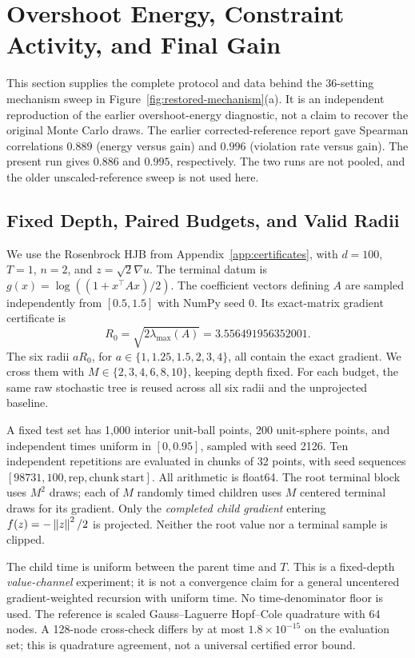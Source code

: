 \FloatBarrier
\section{Overshoot Energy, Constraint Activity, and Final Gain}
\label{app:overshoot}
This section supplies the complete protocol and data behind the 36-setting mechanism sweep in Figure~\ref{fig:restored-mechanism}(a). It is an independent reproduction of the earlier overshoot-energy diagnostic, not a claim to recover the original Monte Carlo draws. The earlier corrected-reference report gave Spearman correlations $0.889$ (energy versus gain) and $0.996$ (violation rate versus gain). The present run gives $0.886$ and $0.995$, respectively. The two runs are not pooled, and the older unscaled-reference sweep is not used here.

\subsection{Fixed Depth, Paired Budgets, and Valid Radii}
We use the Rosenbrock HJB from Appendix~\ref{app:certificates}, with $d=100$, $T=1$, $n=2$, and $z=\sqrt2\nabla u$. The terminal datum is $g(x)=\log((1+x^\top Ax)/2)$. The coefficient vectors defining $A$ are sampled independently from $[0.5,1.5]$ with NumPy seed 0. Its exact-matrix gradient certificate is
\[
 R_0=\sqrt{2\lambda_{\max}(A)}=3.556491956352001.
\]
The six radii $aR_0$, for $a\in\{1,1.25,1.5,2,3,4\}$, all contain the exact gradient. We cross them with $M\in\{2,3,4,6,8,10\}$, keeping depth fixed. For each budget, the same raw stochastic tree is reused across all six radii and the unprojected baseline.

A fixed test set has 1,000 interior unit-ball points, 200 unit-sphere points, and independent times uniform in $[0,0.95]$, sampled with seed 2126. Ten independent repetitions are evaluated in chunks of 32 points, with seed sequences $[98731,100,\mathrm{rep},\mathrm{chunk\ start}]$. All arithmetic is float64. The root terminal block uses $M^2$ draws; each of $M$ randomly timed children uses $M$ centered terminal draws for its gradient. Only the \emph{completed child gradient} entering $f(z)=-\left\lVert z\right\rVert^2/2$ is projected. Neither the root value nor a terminal sample is clipped.

The child time is uniform between the parent time and $T$. This is a fixed-depth \emph{value-channel} experiment; it is not a convergence claim for a general uncentered gradient-weighted recursion with uniform time. No time-denominator floor is used. The reference is scaled Gauss--Laguerre Hopf--Cole quadrature with 64 nodes. A 128-node cross-check differs by at most $1.8\times10^{-15}$ on the evaluation set; this is quadrature agreement, not a universal certified error bound.


